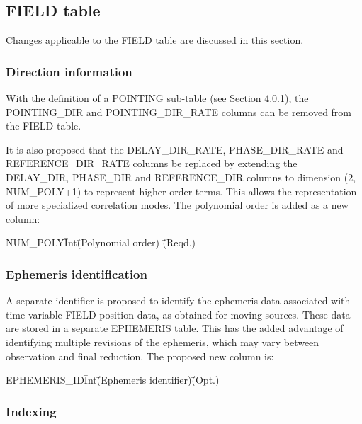 \documentclass{article}
\begin{document}
\subsection{FIELD table}

Changes applicable to the FIELD table are discussed in this section.

\subsubsection{Direction information}

With the definition of a POINTING sub-table (see Section 4.0.1), the
POINTING\_DIR and POINTING\_DIR\_RATE columns can be removed from the
FIELD table. 

It is also proposed that the DELAY\_DIR\_RATE, PHASE\_DIR\_RATE and
REFERENCE\_DIR\_RATE columns be replaced by extending the DELAY\_DIR,
PHASE\_DIR and REFERENCE\_DIR columns to dimension (2, NUM\_POLY+1) to
represent higher order terms. This allows the representation of more
specialized correlation modes. The polynomial order is added as a new
column:

\begin{tabbing}
NUM\_POLY\quad\quad \= Int\quad\quad \= (Polynomial order)
 \quad\quad \= (Reqd.) \\
\end{tabbing}

\subsubsection{Ephemeris identification}

A separate identifier is proposed to identify the ephemeris data
associated with time-variable FIELD position data, as obtained for
moving sources. These data are stored in a separate EPHEMERIS
table. This has the added advantage of identifying multiple revisions
of the ephemeris, which may vary between observation and final
reduction. The proposed new column is:

\begin{tabbing} 
EPHEMERIS\_ID\quad\quad  \= Int\quad\quad\quad\quad \= 
(Ephemeris identifier)\quad\quad\quad\quad \= (Opt.) \\
\end{tabbing}

\subsubsection{Indexing}
\end{document}
